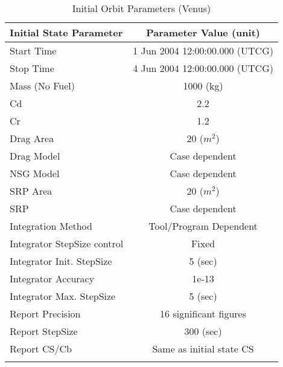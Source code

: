 \begin{table}[htbp!]
\centering \caption{Initial Orbit Parameters (Venus)}
      \begin{tabular}{lc}
      \hline\hline
            Initial State Parameter & Parameter Value (unit)\\
            \hline
            Start Time & 1 Jun 2004 12:00:00.000 (UTCG)\\
            Stop Time & 4 Jun 2004 12:00:00.000 (UTCG)\\
            
            Mass (No Fuel) & 1000 (kg)\\
            Cd & 2.2\\
            Cr & 1.2\\
            Drag Area & 20 ($m^2$)\\
            Drag Model & Case dependent\\
            NSG Model & Case dependent\\
            SRP Area & 20 ($m^2$)\\
            SRP & Case dependent\\
            Integration Method & Tool/Program Dependent\\
            Integrator StepSize control & Fixed\\
            Integrator Init. StepSize & 5 (sec)\\
            Integrator Accuracy & 1e-13\\
            Integrator Max. StepSize & 5 (sec)\\
            Report Precision & 16 significant figures\\
            Report StepSize & 300 (sec)\\
            Report CS/Cb & Same as initial state CS\\
      \hline\hline
      \label{Table: InitStateVenus}
\end{tabular}
\end{table}

